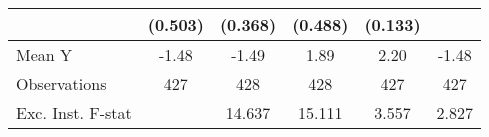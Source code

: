 {\begin{tabular}{l*{5}{c}}
            &     (0.503)         &     (0.368)         &     (0.488)         &     (0.133)         &                     \\
\midrule
Mean Y      &       -1.48         &       -1.49         &        1.89         &        2.20         &       -1.48         \\
Observations&         427         &         428         &         428         &         427         &         427         \\
Exc. Inst. F-stat&                     &      14.637         &      15.111         &       3.557         &       2.827         \\
\bottomrule
\end{tabular}
}
